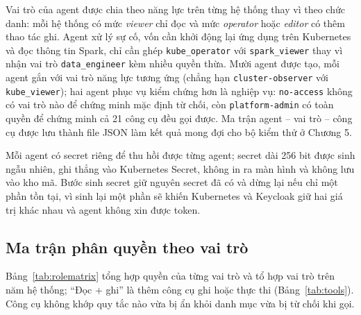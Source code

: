 Vai trò của agent được chia theo năng lực trên từng hệ thống thay vì theo chức danh: mỗi hệ thống có mức \textit{viewer} chỉ đọc và mức \textit{operator} hoặc \textit{editor} có thêm thao tác ghi. Agent xử lý sự cố, vốn cần khởi động lại ứng dụng trên Kubernetes và đọc thông tin Spark, chỉ cần ghép \texttt{kube\_operator} với \texttt{spark\_viewer} thay vì nhận vai trò \texttt{data\_engineer} kèm nhiều quyền thừa. Mười agent được tạo, mỗi agent gắn với vai trò năng lực tương ứng (chẳng hạn \texttt{cluster-observer} với \texttt{kube\_viewer}); hai agent phục vụ kiểm chứng hơn là nghiệp vụ: \texttt{no-access} không có vai trò nào để chứng minh mặc định từ chối, còn \texttt{platform-admin} có toàn quyền để chứng minh cả 21 công cụ đều gọi được. Ma trận agent -- vai trò -- công cụ được lưu thành file JSON làm kết quả mong đợi cho bộ kiểm thử ở Chương 5.

Mỗi agent có secret riêng để thu hồi được từng agent; secret dài 256 bit được sinh ngẫu nhiên, ghi thẳng vào Kubernetes Secret, không in ra màn hình và không lưu vào kho mã. Bước sinh secret giữ nguyên secret đã có và dừng lại nếu chỉ một phần tồn tại, vì sinh lại một phần sẽ khiến Kubernetes và Keycloak giữ hai giá trị khác nhau và agent không xin được token.

\subsection{Ma trận phân quyền theo vai trò}\label{sec:rolematrix}

Bảng~\ref{tab:rolematrix} tổng hợp quyền của từng vai trò và tổ hợp vai trò trên năm hệ thống; ``Đọc + ghi'' là thêm công cụ ghi hoặc thực thi (Bảng~\ref{tab:tools}). Công cụ không khớp quy tắc nào vừa bị ẩn khỏi danh mục vừa bị từ chối khi gọi.

